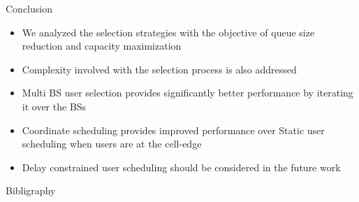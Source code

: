 \documentclass{beamer}
\begin{document}
\begin{frame}{Conclusion}
\begin{itemize}
  \item We analyzed the selection strategies with the objective of queue size reduction and capacity maximization
  \item Complexity involved with the selection process is also addressed
  \item Multi BS user selection provides significantly better performance by iterating it over the BSs
  \item Coordinate scheduling provides improved performance over Static user scheduling when users are at the cell-edge
  \item Delay constrained user scheduling should be considered in the future work
\end{itemize}
\end{frame}

\begin{frame}{Bibligraphy}
\scriptsize {
}
\end{frame}
\end{document}
